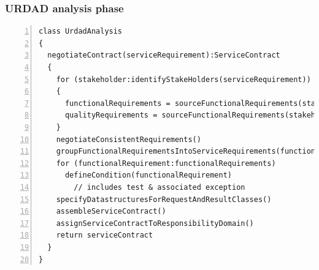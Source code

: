 \begin{frame}[fragile]
  \frametitle{URDAD analysis phase}
\lstset{language=pseudoCode}
\begin{lstlisting}[numbers=left,escapechar=|]
class UrdadAnalysis
{
  negotiateContract(serviceRequirement):ServiceContract
  {
    for (stakeholder:identifyStakeHolders(serviceRequirement))
    {
      functionalRequirements = sourceFunctionalRequirements(stakeholder, serviceRequirement)
      qualityRequirements = sourceFunctionalRequirements(stakeholder, serviceRequirement)
    }
    negotiateConsistentRequirements()
    groupFunctionalRequirementsIntoServiceRequirements(functionalRequirements)
    for (functionalRequirement:functionalRequirements)
      defineCondition(functionalRequirement)
        // includes test & associated exception
    specifyDatastructuresForRequestAndResultClasses()
    assembleServiceContract()
    assignServiceContractToResponsibilityDomain()
    return serviceContract
  }
}
\end{lstlisting}
\end{frame}
